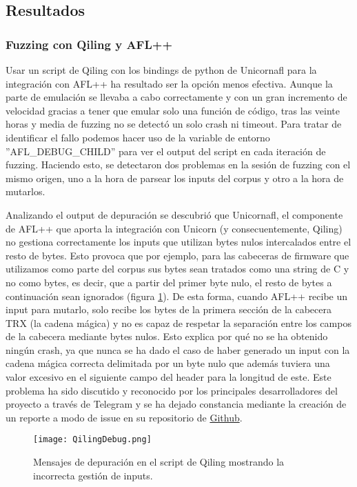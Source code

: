 \subsection{Resultados}
\subsubsection{Fuzzing con Qiling y AFL++}
Usar un script de Qiling con los bindings de python de Unicornafl para la integración con AFL++ ha resultado ser la opción menos efectiva. 
Aunque la parte de emulación se llevaba a cabo correctamente y con un gran incremento de velocidad gracias a tener que emular solo una función de 
código, tras las veinte horas y media de fuzzing no se detectó un solo crash ni timeout. Para tratar de identificar el fallo podemos hacer 
uso de la variable de entorno ''AFL\_DEBUG\_CHILD'' para ver el output del script en cada iteración de fuzzing. Haciendo esto, se detectaron dos 
problemas en la sesión de fuzzing con el mismo origen, uno a la hora de parsear los inputs del corpus y otro a la hora de mutarlos.\bigskip

Analizando el output de depuración se descubrió que Unicornafl, el componente de AFL++ que 
aporta la integración con Unicorn (y consecuentemente, Qiling) no gestiona correctamente los inputs que utilizan bytes nulos intercalados 
entre el resto de bytes. Esto provoca que por ejemplo, para las cabeceras de firmware que utilizamos como parte del corpus sus bytes sean 
tratados como una string de C y no como bytes, es decir, que a partir del primer byte nulo, el resto de bytes a continuación sean ignorados 
(figura \ref{fig:QilingDebug}). De esta forma, cuando AFL++ recibe un input para mutarlo, solo recibe los bytes de la primera sección 
de la cabecera TRX (la cadena mágica) y no es capaz 
de respetar la separación entre los campos de la cabecera mediante bytes nulos. Esto explica por qué no se ha obtenido ningún crash, ya que 
nunca se ha dado el caso de haber generado un input con la cadena mágica correcta delimitada por un byte nulo que además tuviera una valor 
excesivo en el siguiente campo del header para la longitud de este. Este problema ha sido discutido y reconocido por los principales 
desarrolladores del proyecto a través de Telegram y se ha dejado constancia mediante la creación de un reporte a modo de issue en su repositorio
de \href{https://github.com/AFLplusplus/unicornafl/issues/13}{Github}. 
\begin{figure}[H]
    \centering
    \texttt{[image: QilingDebug.png]}
    \caption{Mensajes de depuración en el script de Qiling mostrando la incorrecta gestión de inputs.}
    \label{fig:QilingDebug}
\end{figure}

